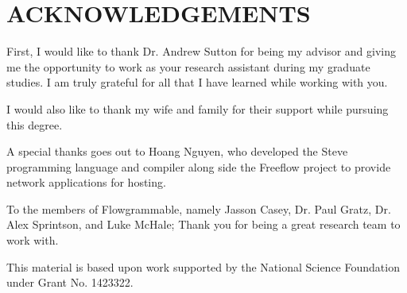 \chapter*{ACKNOWLEDGEMENTS}

First, I would like to thank Dr. Andrew Sutton for being my advisor and giving
me the opportunity to work as your research assistant during my graduate studies.
I am truly grateful for all that I have learned while working with you.

I would also like to thank my wife and family for their support while pursuing
this degree.

A special thanks goes out to Hoang Nguyen, who developed the Steve programming
language and compiler along side the Freeflow project to provide network applications for hosting.

To the members of Flowgrammable, namely Jasson Casey, Dr.
Paul Gratz, Dr. Alex Sprintson, and Luke McHale; Thank you for being a great research
team to work with.

This material is based upon work supported by the National Science Foundation under Grant No. 1423322.
